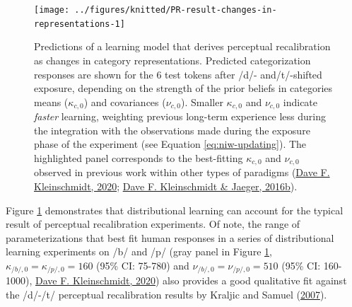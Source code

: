 \documentclass[
  11pt,
  english,
  man,floatsintext]{apa6}
\begin{document}
\begin{figure}

{\centering \texttt{[image: ../figures/knitted/PR-result-changes-in-representations-1]} 

}

\caption{Predictions of a learning model that derives perceptual recalibration as changes in category representations. Predicted categorization responses are shown for the 6 test tokens after /d/- and/t/-shifted exposure, depending on the strength of the prior beliefs in categories means (\(\kappa_{c,0}\)) and covariances (\(\nu_{c,0}\)). Smaller \(\kappa_{c,0}\) and \(\nu_{c,0}\) indicate \emph{faster} learning, weighting previous long-term experience less during the integration with the observations made during the exposure phase of the experiment (see Equation \eqref{eq:niw-updating}). The highlighted panel corresponds to the best-fitting \(\kappa_{c,0}\) and \(\nu_{c,0}\) observed in previous work within other types of paradigms (\protect\hyperlink{ref-kleinschmidt2020}{Dave F. Kleinschmidt, 2020}; \protect\hyperlink{ref-kleinschmidt-jaeger2016cogsci}{Dave F. Kleinschmidt \& Jaeger, 2016b}).}\label{fig:PR-result-changes-in-representations}
\end{figure}

Figure \ref{fig:PR-result-changes-in-representations} demonstrates that distributional learning can account for the typical result of perceptual recalibration experiments. Of note, the range of parameterizations that best fit human responses in a series of distributional learning experiments on /b/ and /p/ (gray panel in Figure \ref{fig:PR-result-changes-in-representations}, \(\kappa_{/b/,0}=\kappa_{/p/,0}=160\) (95\% CI: 75-780) and \(\nu_{/b/,0}=\nu_{/p/,0}=510\) (95\% CI: 160-1000), \protect\hyperlink{ref-kleinschmidt2020}{Dave F. Kleinschmidt, 2020}) also provides a good qualitative fit against the /d/-/t/ perceptual recalibration results by Kraljic and Samuel (\protect\hyperlink{ref-kraljic-samuel2007}{2007}).
\end{document}
